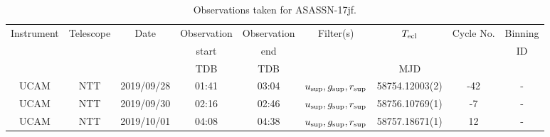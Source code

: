 \begin{table}
	\begin{center}
		\caption{Observations taken for ASASSN-17jf.}
		\label{table:observing:observation logs ASASSN-17jf}
		\begin{tabular}{ccccccccc}
			\hline
			Instrument & Telescope & Date & Observation  & Observation  & Filter(s) & $T_{\rm ecl}$ & Cycle No. & Binning \\
			 &  &  &  start &  end &  &  &  & ID \\
			 &  &  & TDB & TDB &  & MJD &  &  \\
			\hline
			\hline
			UCAM & NTT & 2019/09/28 & 01:41 & 03:04 & $u_{\rm sup},g_{\rm sup},r_{\rm sup}$ & 58754.12003(2) & -42 & - \\
			UCAM & NTT & 2019/09/30 & 02:16 & 02:46 & $u_{\rm sup},g_{\rm sup},r_{\rm sup}$ & 58756.10769(1) &  -7 & - \\
			UCAM & NTT & 2019/10/01 & 04:08 & 04:38 & $u_{\rm sup},g_{\rm sup},r_{\rm sup}$ & 58757.18671(1) &  12 & - \\
		   \hline
		\end{tabular}
	\end{center}
\end{table}